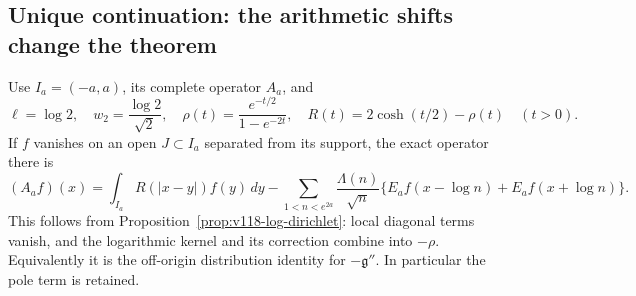 \subsection*{Unique continuation: the arithmetic shifts change the theorem}

Use $I_a=(-a,a)$, its complete operator $A_a$, and
\[
 \ell=\log2,\quad w_2=\frac{\log2}{\sqrt2},\quad
 \rho(t)=\frac{e^{-t/2}}{1-e^{-2t}},\quad
 R(t)=2\cosh(t/2)-\rho(t)\quad(t>0).
\]
If $f$ vanishes on an open $J\subset I_a$ separated from its support,
the exact operator there is
\begin{equation}\label{eq:ns55-off-support-operator}
 (A_af)(x)=\int_{I_a}R(|x-y|)f(y)\,dy
 -\sum_{1<n<e^{2a}}\frac{\Lambda(n)}{\sqrt n}
       \{E_af(x-\log n)+E_af(x+\log n)\}.
\end{equation}
This follows from Proposition~\ref{prop:v118-log-dirichlet}: local
diagonal terms vanish, and the logarithmic kernel and its correction
combine into $-\rho$. Equivalently it is the off-origin distribution
identity for $-\mathfrak g''$. In particular the pole term is retained.

